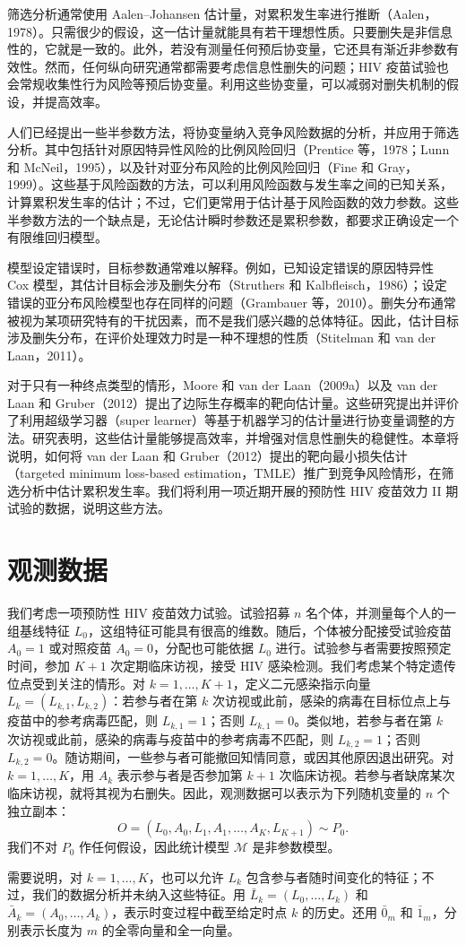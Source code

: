 筛选分析通常使用 Aalen--Johansen 估计量，对累积发生率进行推断（Aalen，1978）。只需很少的假设，这一估计量就能具有若干理想性质。只要删失是非信息性的，它就是一致的。此外，若没有测量任何预后协变量，它还具有渐近非参数有效性。然而，任何纵向研究通常都需要考虑信息性删失的问题；HIV 疫苗试验也会常规收集性行为风险等预后协变量。利用这些协变量，可以减弱对删失机制的假设，并提高效率。

人们已经提出一些半参数方法，将协变量纳入竞争风险数据的分析，并应用于筛选分析。其中包括针对原因特异性风险的比例风险回归（Prentice 等，1978；Lunn 和 McNeil，1995），以及针对亚分布风险的比例风险回归（Fine 和 Gray，1999）。这些基于风险函数的方法，可以利用风险函数与发生率之间的已知关系，计算累积发生率的估计；不过，它们更常用于估计基于风险函数的效力参数。这些半参数方法的一个缺点是，无论估计瞬时参数还是累积参数，都要求正确设定一个有限维回归模型。

\begin{sourcebox}
模型设定错误时，目标参数通常难以解释。例如，已知设定错误的原因特异性 Cox 模型，其估计目标会涉及删失分布（Struthers 和 Kalbfleisch，1986）；设定错误的亚分布风险模型也存在同样的问题（Grambauer 等，2010）。删失分布通常被视为某项研究特有的干扰因素，而不是我们感兴趣的总体特征。因此，估计目标涉及删失分布，在评价处理效力时是一种不理想的性质（Stitelman 和 van der Laan，2011）。
\end{sourcebox}

对于只有一种终点类型的情形，Moore 和 van der Laan（2009a）以及 van der Laan 和 Gruber（2012）提出了边际生存概率的靶向估计量。这些研究提出并评价了利用超级学习器（super learner）等基于机器学习的估计量进行协变量调整的方法。研究表明，这些估计量能够提高效率，并增强对信息性删失的稳健性。本章将说明，如何将 van der Laan 和 Gruber（2012）提出的靶向最小损失估计（targeted minimum loss-based estimation，TMLE）推广到竞争风险情形，在筛选分析中估计累积发生率。我们将利用一项近期开展的预防性 HIV 疫苗效力 II 期试验的数据，说明这些方法。

\section{观测数据}

我们考虑一项预防性 HIV 疫苗效力试验。试验招募 $n$ 名个体，并测量每个人的一组基线特征 $L_0$，这组特征可能具有很高的维数。随后，个体被分配接受试验疫苗 $A_0=1$ 或对照疫苗 $A_0=0$，分配也可能依据 $L_0$ 进行。试验参与者需要按照预定时间，参加 $K+1$ 次定期临床访视，接受 HIV 感染检测。我们考虑某个特定遗传位点受到关注的情形。对 $k=1,\ldots,K+1$，定义二元感染指示向量 $L_k=(L_{k,1},L_{k,2})$：若参与者在第 $k$ 次访视或此前，感染的病毒在目标位点上与疫苗中的参考病毒匹配，则 $L_{k,1}=1$；否则 $L_{k,1}=0$。类似地，若参与者在第 $k$ 次访视或此前，感染的病毒与疫苗中的参考病毒不匹配，则 $L_{k,2}=1$；否则 $L_{k,2}=0$。随访期间，一些参与者可能撤回知情同意，或因其他原因退出研究。对 $k=1,\ldots,K$，用 $A_k$ 表示参与者是否参加第 $k+1$ 次临床访视。若参与者缺席某次临床访视，就将其视为右删失。因此，观测数据可以表示为下列随机变量的 $n$ 个独立副本：
\[
 O=(L_0,A_0,L_1,A_1,\ldots,A_K,L_{K+1})\sim P_0.
\]
我们不对 $P_0$ 作任何假设，因此统计模型 $\mathcal M$ 是非参数模型。

需要说明，对 $k=1,\ldots,K$，也可以允许 $L_k$ 包含参与者随时间变化的特征；不过，我们的数据分析并未纳入这些特征。用 $\bar L_k=(L_0,\ldots,L_k)$ 和 $\bar A_k=(A_0,\ldots,A_k)$，表示时变过程中截至给定时点 $k$ 的历史。还用 $\bar0_m$ 和 $\bar1_m$，分别表示长度为 $m$ 的全零向量和全一向量。
